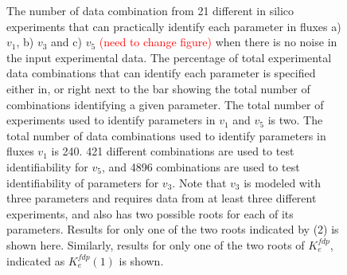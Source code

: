 \documentclass[10pt]{article}
\begin{document}
	\begin{figure}[!tbhp]
		\caption{The number of data combination from 21 different in silico experiments that can practically identify each parameter in fluxes a) $v_1$, b) $v_3$ and c) $v_5$ \textcolor{red}{(need to change figure)} when there is no noise in the input experimental data. The percentage of total experimental data combinations that can identify each parameter is specified either in, or right next to the bar showing the total number of combinations identifying a given parameter. The total number of experiments used to identify parameters in $v_1$ and $v_5$ is two. The total number of data combinations used to identify parameters in fluxes $v_1$ is 240. 421 different combinations are used to test identifiability for $v_5$, and 4896 combinations are used to test identifiability of parameters for $v_3$. Note that $v_3$ is modeled with three parameters and requires data from at least three different experiments, and also has two possible roots for each of its parameters. Results for only one of the two roots indicated by (2) is shown here. Similarly, results for only one of the two roots of $K_e^{fdp}$, indicated as $K_e^{fdp}(1)$ is shown.}\label{fig:ident_root2}
	\end{figure}
\end{document}
